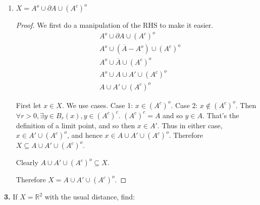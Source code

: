 \documentclass{article}
\newcommand{\R}{\mathbb{R}}
\newcommand{\ol}[1]{\overline{#1}}
\begin{document}
\begin{enumerate}
\begin{proof}
        Therefore $\ol{A} = \partial A \cup A^o$.        
    \end{proof}


    \item 
    $X = A^o \cup \partial A \cup (A^c)^o$
    \begin{proof}
        We first do a manipulation of the RHS to make it easier. 
        \begin{align*}
            &A^o \cup \partial A \cup (A^c)^o \\
            &A^o \cup (\ol{A} - A^o) \cup (A^c)^o \\
            &A^o \cup \ol{A} \cup (A^c)^o \\
            &A^o \cup A \cup A' \cup (A^c)^o \\
            &A \cup A' \cup (A^c)^o
        \end{align*}

        First let $x \in X$. We use cases. Case 1: $x \in (A^c)^o$. Case 2: $x \notin (A^c)^o$. Then $\forall r > 0, \exists y \in B_r(x), y \in (A^c)^c$. $(A^c)^c = A$ and so $y \in A$. That's the definition of a limit point, and so then $x \in A'$. Thus in either case, $x \in A' \cup (A^c)^o$, and hence $x \in A \cup A' \cup (A^c)^o$. Therefore $X \subseteq A \cup A' \cup (A^c)^o$.

        Clearly $A \cup A' \cup (A^c)^o \subseteq X$.

        Therefore $X = A \cup A' \cup (A^c)^o$.        
    \end{proof}
\end{enumerate}

\newpage %

\textbf{3. }
If $X = \R^2$ with the usual distance, find:
\end{document}

